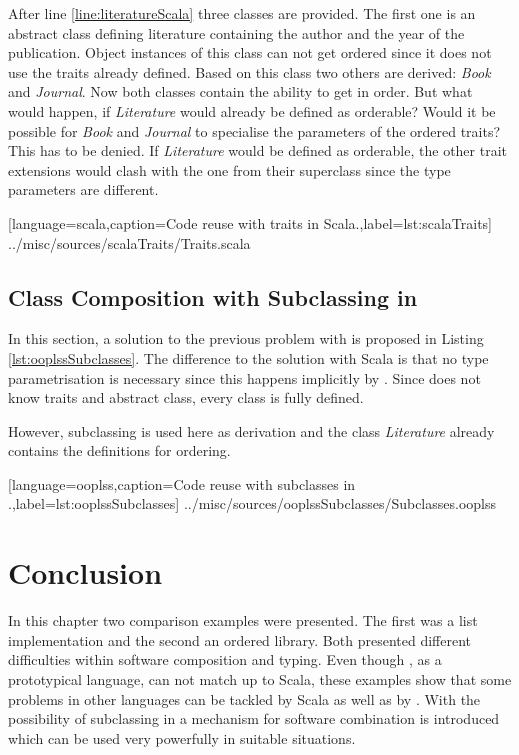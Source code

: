After line \ref{line:literatureScala} three classes are provided. The
first one is an abstract class defining literature containing the author
and the year of the publication. Object instances of this class can not
get ordered since it does not use the traits already defined. Based on
this class two others are derived: \emph{Book} and \emph{Journal}. Now
both classes contain the ability to get in order. But what would happen,
if \emph{Literature} would already be defined as orderable? Would it be
possible for \emph{Book} and \emph{Journal} to specialise the parameters
of the ordered traits? This has to be denied. If \emph{Literature} would
be defined as orderable, the other trait extensions would clash with
the one from their superclass since the type parameters are different.


[language=scala,caption=Code reuse with traits in Scala.,label=lst:scalaTraits]
{../misc/sources/scalaTraits/Traits.scala}

\subsection{Class Composition with Subclassing in \ooplss}
In this section, a solution to the previous problem with \ooplss is proposed in Listing
\ref{lst:ooplssSubclasses}. The difference to the solution with
Scala is that no type parametrisation is necessary since this happens
implicitly by \mytype. Since \ooplss does not know traits and abstract
class, every class is fully defined.

However, subclassing is used here as derivation and the class
\emph{Literature} already contains the definitions for ordering.


[language=ooplss,caption=Code reuse with subclasses in \ooplss.,label=lst:ooplssSubclasses]
{../misc/sources/ooplssSubclasses/Subclasses.ooplss}

\section{Conclusion}
In this chapter two comparison examples were presented. The first was a
list implementation and the second an ordered library. Both presented
different difficulties within software composition and typing. Even
though \ooplss, as a prototypical language, can not match up to Scala,
these examples show that some problems in other languages can be tackled
by Scala as well as by \ooplss. With the possibility of subclassing in
\ooplss a mechanism for software combination is introduced which can be
used very powerfully in suitable situations.
